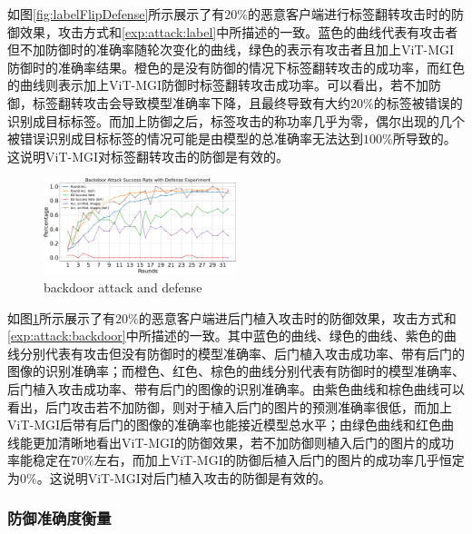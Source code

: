 \documentclass[conference]{IEEEtran}
\def\figBackdoorAttackDefense{0.5\textwidth}
\begin{document}
如图\hyperref[fig:labelFlipDefense]{\ref{fig:labelFlipDefense}}所示展示了有$20\%$的恶意客户端进行标签翻转攻击时的防御效果，攻击方式和\hyperref[exp:attack:label]{\ref{exp:attack:label}}中所描述的一致。蓝色的曲线代表有攻击者但不加防御时的准确率随轮次变化的曲线，绿色的表示有攻击者且加上ViT-MGI防御时的准确率结果。橙色的是没有防御的情况下标签翻转攻击的成功率，而红色的曲线则表示加上ViT-MGI防御时标签翻转攻击成功率。可以看出，若不加防御，标签翻转攻击会导致模型准确率下降，且最终导致有大约$20\%$的标签被错误的识别成目标标签。而加上防御之后，标签攻击的称功率几乎为零，偶尔出现的几个被错误识别成目标标签的情况可能是由模型的总准确率无法达到$100\%$所导致的。这说明ViT-MGI对标签翻转攻击的防御是有效的。

\begin{figure}[htbp]
    \centerline{\includegraphics[width=\figBackdoorAttackDefense]{pics/006-backdoorAttack-WithDefense.pdf}}
    \caption{backdoor attack and defense}
    \label{fig:backdoorAttackDefense}
\end{figure}

如图\hyperref[fig:backdoorAttackDefense]{\ref{fig:backdoorAttackDefense}}所示展示了有$20\%$的恶意客户端进后门植入攻击时的防御效果，攻击方式和\hyperref[exp:attack:backdoor]{\ref{exp:attack:backdoor}}中所描述的一致。其中蓝色的曲线、绿色的曲线、紫色的曲线分别代表有攻击但没有防御时的模型准确率、后门植入攻击成功率、带有后门的图像的识别准确率；而橙色、红色、棕色的曲线分别代表有防御时的模型准确率、后门植入攻击成功率、带有后门的图像的识别准确率。由紫色曲线和棕色曲线可以看出，后门攻击若不加防御，则对于植入后门的图片的预测准确率很低，而加上ViT-MGI后带有后门的图像的准确率也能接近模型总水平；由绿色曲线和红色曲线能更加清晰地看出ViT-MGI的防御效果，若不加防御则植入后门的图片的成功率能稳定在$70\%$左右，而加上ViT-MGI的防御后植入后门的图片的成功率几乎恒定为$0\%$。这说明ViT-MGI对后门植入攻击的防御是有效的。

\subsubsection{\textbf{防御准确度衡量}}
\label{exp:defense_accuracy}
\end{document}
